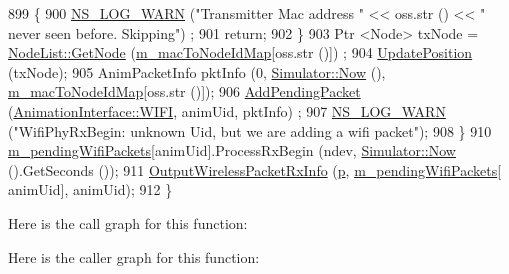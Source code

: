 \begin{DoxyCode}
899       \{
900         \hyperlink{group__logging_gade7208b4009cdf0e25783cd26766f559}{NS\_LOG\_WARN} (\textcolor{stringliteral}{"Transmitter Mac address "} << oss.str () << \textcolor{stringliteral}{" never seen before. Skipping"})
      ;
901         \textcolor{keywordflow}{return};
902       \}
903       Ptr <Node> txNode = \hyperlink{classns3_1_1NodeList_a80ac09977d48d29db5c704ac8483cf6c}{NodeList::GetNode} (\hyperlink{classns3_1_1AnimationInterface_a4d47d5b16cac7965cc0fbb1c50b3a268}{m\_macToNodeIdMap}[oss.str ()])
      ;
904       \hyperlink{classns3_1_1AnimationInterface_ab751cf6f459289f0978f4bb97b93044d}{UpdatePosition} (txNode);
905       AnimPacketInfo pktInfo (0, \hyperlink{classns3_1_1Simulator_ac3178fa975b419f7875e7105be122800}{Simulator::Now} (), 
      \hyperlink{classns3_1_1AnimationInterface_a4d47d5b16cac7965cc0fbb1c50b3a268}{m\_macToNodeIdMap}[oss.str ()]);
906       \hyperlink{classns3_1_1AnimationInterface_ab7f3bc1843610f2d9514ddf5d756eaa5}{AddPendingPacket} (\hyperlink{classns3_1_1AnimationInterface_a801a4efd553ff0d1d768cd70d22456b6afc37c88b12f1b26ee565dac2536d0bb5}{AnimationInterface::WIFI}, animUid, pktInfo)
      ;
907       \hyperlink{group__logging_gade7208b4009cdf0e25783cd26766f559}{NS\_LOG\_WARN} (\textcolor{stringliteral}{"WifiPhyRxBegin: unknown Uid, but we are adding a wifi packet"});
908     \}
910   \hyperlink{classns3_1_1AnimationInterface_a9ef0e9ce4273ba81324813f79a069003}{m\_pendingWifiPackets}[animUid].ProcessRxBegin (ndev, 
      \hyperlink{classns3_1_1Simulator_ac3178fa975b419f7875e7105be122800}{Simulator::Now} ().GetSeconds ());
911   \hyperlink{classns3_1_1AnimationInterface_ae7dbb6c566787d3444e3fcba367e5338}{OutputWirelessPacketRxInfo} (\hyperlink{lte__link__budget_8m_ac9de518908a968428863f829398a4e62}{p}, \hyperlink{classns3_1_1AnimationInterface_a9ef0e9ce4273ba81324813f79a069003}{m\_pendingWifiPackets}[
      animUid], animUid);
912 \}
\end{DoxyCode}


Here is the call graph for this function\+:




Here is the caller graph for this function\+:



